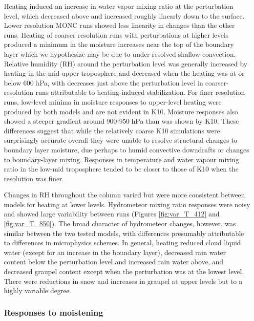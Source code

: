 \documentclass[draft]{agujournal2019}
\begin{document}
Heating induced an increase in water vapor mixing ratio at the perturbation
level, which decreased above and increased roughly linearly down to the surface.
Lower resolution MONC runs showed less linearity in changes than the other runs.
Heating of coarser resolution runs with perturbations at higher levels produced
a minimum in the moisture increases near the top of the boundary layer which we
hypothesize may be due to under-resolved shallow convection. Relative humidity
(RH) around the perturbation level was generally increased by heating in the
mid-upper troposphere and decreased when the heating was at or below 600 hPa,
with decreases just above the perturbation level in coarser-resolution runs
attributable to heating-induced stabilization. For finer resolution runs,
low-level minima in moisture responses to upper-level heating were produced by
both models and are not evident in K10. Moisture responses also showed a steeper
gradient around 900-950 hPa than was shown by K10. These differences suggest
that while the relatively coarse K10 simulations were surprisingly accurate
overall they were unable to resolve structural changes to boundary layer
moisture, due perhaps to humid convective downdrafts or changes to
boundary-layer mixing. Responses in temperature and water vapour mixing ratio in
the low-mid troposphere tended to be closer to those of K10 when the resolution
was finer.

Changes in RH throughout the column varied but were more consistent between
models for heating at lower levels. Hydrometeor mixing ratio responses were
noisy and showed large variability between runs (Figures \ref{fig:var_T_412} and
\ref{fig:var_T_850}). The broad character of hydrometeor changes, however, was
similar between the two tested models, with differences presumably attributable
to differences in microphysics schemes. In general, heating reduced cloud liquid
water (except for an increase in the boundary layer), decreased rain water
content below the perturbation level and increased rain water above, and
decreased graupel content except when the perturbation was at the lowest level.
There were reductions in snow and increases in graupel at upper levels but to a
highly variable degree.

\subsubsection{Responses to moistening}
\end{document}
